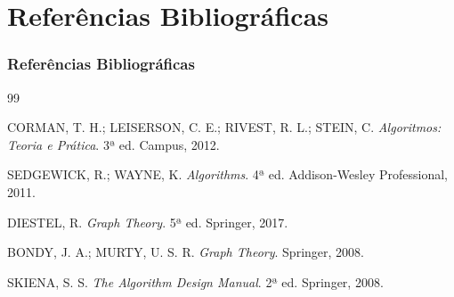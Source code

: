 \section{Referências Bibliográficas}

\begin{frame}[allowframebreaks]
    \frametitle{Referências Bibliográficas}

    \begin{thebibliography}{99}

        CORMAN, T. H.; LEISERSON, C. E.; RIVEST, R. L.; STEIN, C. \textit{Algoritmos: Teoria e Prática}. 3ª ed. Campus, 2012.        

        SEDGEWICK, R.; WAYNE, K. \textit{Algorithms}. 4ª ed. Addison-Wesley Professional, 2011.        

        DIESTEL, R. \textit{Graph Theory}. 5ª ed. Springer, 2017.        

        BONDY, J. A.; MURTY, U. S. R. \textit{Graph Theory}. Springer, 2008.        

        SKIENA, S. S. \textit{The Algorithm Design Manual}. 2ª ed. Springer, 2008.        

    \end{thebibliography}

\end{frame}

